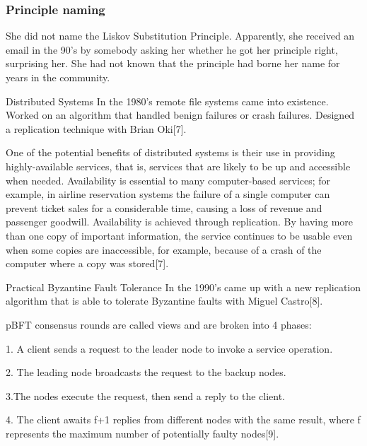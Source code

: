 \documentclass{beamer}
\begin{document}

\begin{frame}
\frametitle{Principle naming}
She did not name the Liskov Substitution Principle. Apparently, she received an email in the 90’s by somebody asking her whether he got her principle right, surprising her. She had not known that the principle had borne her name for years in the community.
\end{frame}

\begin{frame}{Distributed Systems}
In the 1980’s remote file systems came into existence. Worked on an algorithm that handled benign failures or crash failures.
 Designed a replication technique with Brian Oki[7].
 
 \vspace{2mm}
 
 One of the potential benefits of distributed systems is their use in providing highly-available services, that is, services that are likely to be up and accessible when needed. Availability is essential to many computer-based services; for example, in airline reservation systems the failure of a single computer can prevent ticket sales for a considerable time, causing a loss of revenue and passenger goodwill. Availability is achieved through replication. By having more than one copy of important information, the service continues to be usable even when some copies are inaccessible, for example, because of a crash of the computer where a copy was stored[7].


    
\end{frame}
\begin{frame}{Practical Byzantine Fault Tolerance}
In the 1990's came up with a new replication algorithm that  is able to tolerate Byzantine faults with Miguel Castro[8].

\vspace{2mm}

pBFT consensus rounds are called views and are broken into 4 phases:

    \vspace{3mm}
    
   1. A client sends a request to the leader node to invoke a service operation.
   \newline
   
   2. The leading node broadcasts the request to the backup nodes.
   \newline
  
    3.The nodes execute the request, then send a reply to the client.
    \newline
    
   4. The client awaits f+1 replies from different nodes with the same result, where f represents the maximum number of potentially faulty nodes[9].
   
   \vspace{1mm}

\end{frame}
\end{document}
